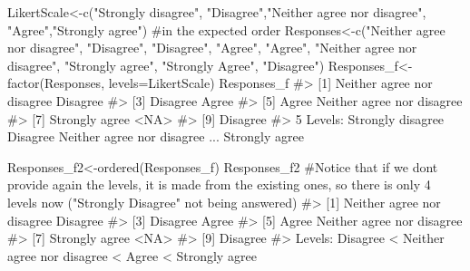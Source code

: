 \documentclass[
  letterpaper,
  DIV=11,
  numbers=noendperiod]{scrreprt}
\newenvironment{Shaded}{\begin{snugshade}}{\end{snugshade}}
\newcommand{\AttributeTok}[1]{\textcolor[rgb]{0.40,0.45,0.13}{#1}}
\newcommand{\CommentTok}[1]{\textcolor[rgb]{0.37,0.37,0.37}{#1}}
\newcommand{\FunctionTok}[1]{\textcolor[rgb]{0.28,0.35,0.67}{#1}}
\newcommand{\NormalTok}[1]{\textcolor[rgb]{0.00,0.23,0.31}{#1}}
\newcommand{\OtherTok}[1]{\textcolor[rgb]{0.00,0.23,0.31}{#1}}
\newcommand{\StringTok}[1]{\textcolor[rgb]{0.13,0.47,0.30}{#1}}
\begin{document}
\begin{Shaded}
\begin{Highlighting}[]
\NormalTok{LikertScale}\OtherTok{\textless{}{-}}\FunctionTok{c}\NormalTok{(}\StringTok{"Strongly disagree"}\NormalTok{, }\StringTok{"Disagree"}\NormalTok{,}\StringTok{"Neither agree nor disagree"}\NormalTok{,}
\StringTok{"Agree"}\NormalTok{,}\StringTok{"Strongly agree"}\NormalTok{) }\CommentTok{\#in the expected order}
\NormalTok{Responses}\OtherTok{\textless{}{-}}\FunctionTok{c}\NormalTok{(}\StringTok{"Neither agree nor disagree"}\NormalTok{, }\StringTok{"Disagree"}\NormalTok{, }\StringTok{"Disagree"}\NormalTok{, }\StringTok{"Agree"}\NormalTok{, }\StringTok{"Agree"}\NormalTok{, }\StringTok{"Neither agree nor disagree"}\NormalTok{, }\StringTok{"Strongly agree"}\NormalTok{, }\StringTok{"Strongly Agree"}\NormalTok{, }\StringTok{"Disagree"}\NormalTok{)}
\NormalTok{Responses\_f}\OtherTok{\textless{}{-}}\FunctionTok{factor}\NormalTok{(Responses, }\AttributeTok{levels=}\NormalTok{LikertScale)}
\NormalTok{Responses\_f}
\CommentTok{\#\textgreater{} [1] Neither agree nor disagree Disagree                  }
\CommentTok{\#\textgreater{} [3] Disagree                   Agree                     }
\CommentTok{\#\textgreater{} [5] Agree                      Neither agree nor disagree}
\CommentTok{\#\textgreater{} [7] Strongly agree             \textless{}NA\textgreater{}                      }
\CommentTok{\#\textgreater{} [9] Disagree                  }
\CommentTok{\#\textgreater{} 5 Levels: Strongly disagree Disagree Neither agree nor disagree ... Strongly agree}

\NormalTok{Responses\_f2}\OtherTok{\textless{}{-}}\FunctionTok{ordered}\NormalTok{(Responses\_f)}
\NormalTok{Responses\_f2 }\CommentTok{\#Notice that if we don\textquotesingle{}t provide again the levels, it is made from the existing ones, so there is only 4 levels now ("Strongly Disagree" not being answered)}
\CommentTok{\#\textgreater{} [1] Neither agree nor disagree Disagree                  }
\CommentTok{\#\textgreater{} [3] Disagree                   Agree                     }
\CommentTok{\#\textgreater{} [5] Agree                      Neither agree nor disagree}
\CommentTok{\#\textgreater{} [7] Strongly agree             \textless{}NA\textgreater{}                      }
\CommentTok{\#\textgreater{} [9] Disagree                  }
\CommentTok{\#\textgreater{} Levels: Disagree \textless{} Neither agree nor disagree \textless{} Agree \textless{} Strongly agree}


\end{Highlighting}
\end{Shaded}
\end{document}
